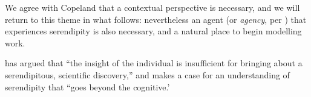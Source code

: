 


  We
agree with Copeland that a contextual perspective is necessary, and we
will return to this theme in what follows: nevertheless an agent (or
\emph{agency}, per \citet{society-of-mind}) that experiences
serendipity is also necessary, and a natural place to begin modelling
work.

 \citet{copeland2017serendipity} has
argued that ``the insight of the individual is insufficient for
bringing about a serendipitous, scientific discovery,'' and makes a
case for an understanding of serendipity that ``goes beyond the
cognitive.'

